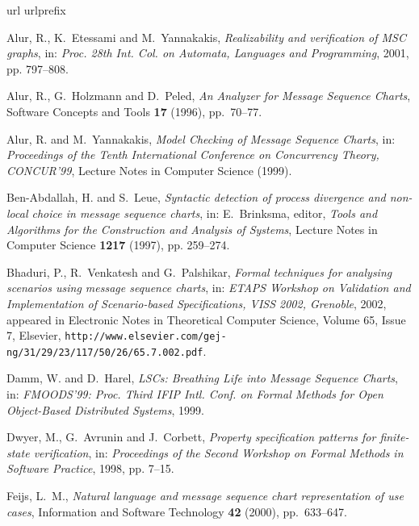 \documentclass{entcs}
\begin{document}
\begin{thebibliography}{10}
\expandafter\ifx\csname url\endcsname\relax
  \def\url#1{\texttt{#1}}\fi
\expandafter\ifx\csname urlprefix\endcsname\relax\def\urlprefix{URL }\fi
\newcommand{\enquote}[1]{``#1''}

Alur, R., K.~Etessami and M.~Yannakakis, \emph{Realizability and verification
  of {MSC} graphs}, in: \emph{Proc. 28th Int. Col. on Automata, Languages and
  Programming}, 2001, pp. 797--808.

Alur, R., G.~Holzmann and D.~Peled, \emph{{An Analyzer for Message Sequence
  Charts}}, Software Concepts and Tools \textbf{17} (1996), pp.~70--77.

Alur, R. and M.~Yannakakis, \emph{{M}odel {C}hecking of {M}essage {S}equence
  {C}harts}, in: \emph{Proceedings of the Tenth International Conference on
  Concurrency Theory, CONCUR'99}, Lecture Notes in Computer Science (1999).

Ben-Abdallah, H. and S.~Leue, \emph{Syntactic detection of process divergence
  and non-local choice in message sequence charts}, in: E.~Brinksma, editor,
  \emph{Tools and Algorithms for the Construction and Analysis of Systems},
  Lecture Notes in Computer Science  \textbf{1217} (1997), pp. 259--274.

Bhaduri, P., R.~Venkatesh and G.~Palshikar, \emph{Formal techniques for
  analysing scenarios using message sequence charts}, in: \emph{ETAPS Workshop
  on Validation and Implementation of Scenario-based Specifications, VISS 2002,
  Grenoble}, 2002, appeared in Electronic Notes in Theoretical Computer
  Science, Volume 65, Issue 7, Elsevier,
  \url{http://www.elsevier.com/gej-ng/31/29/23/117/50/26/65.7.002.pdf}.

Damm, W. and D.~Harel, \emph{{LSCs}: Breathing {L}ife into {M}essage {S}equence
  {C}harts}, in: \emph{FMOODS'99: Proc. Third IFIP Intl. Conf. on Formal
  Methods for Open Object-Based Distributed Systems}, 1999.

Dwyer, M., G.~Avrunin and J.~Corbett, \emph{Property specification patterns for
  finite-state verification}, in: \emph{Proceedings of the Second Workshop on
  Formal Methods in Software Practice}, 1998, pp. 7--15.

Feijs, L.~M., \emph{Natural language and message sequence chart representation
  of use cases}, Information and Software Technology \textbf{42} (2000),
  pp.~633--647.


\end{thebibliography}
\end{document}
